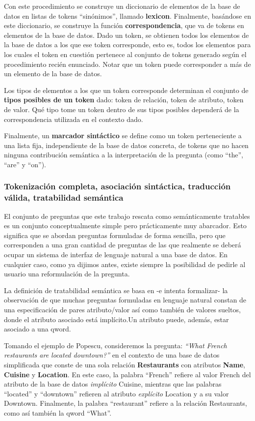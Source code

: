 Con este procedimiento se construye un diccionario de elementos de la base de datos en listas de tokens ``sinónimos'', llamado \textbf{lexicon}. Finalmente, basándose en este diccionario, se construye la función \textbf{correspondencia}, que va de tokens en elementos de la base de datos.
Dado un token, se obtienen todos los elementos de la base de datos a los que ese token corresponde, esto es, todos los elementos para los cuales el token en cuestión pertenece al conjunto de tokens generado según el procedimiento recién enunciado. Notar que un token puede corresponder a más de un elemento de la base de datos.

Los tipos de elementos a los que un token corresponde determinan el conjunto de \textbf{tipos posibles de un token} dado: token de relación, token de atributo, token de valor. Qué tipo tome un token dentro de sus tipos posibles dependerá de la correspondencia utilizada en el contexto dado.

Finalmente, un \textbf{marcador sintáctico} se define como un token perteneciente a una lista fija, independiente de la base de datos concreta, de tokens que no hacen ninguna contribución semántica a la interpretación de la pregunta (como ``the'', ``are'' y ``on'').

\subsubsection*{Tokenización completa, asociación sintáctica, traducción válida, tratabilidad semántica}

El conjunto de preguntas que este trabajo rescata como semánticamente tratables es un conjunto conceptualmente simple pero prácticamente muy abarcador. Esto significa que se abordan preguntas formuladas de forma sencilla, pero que corresponden a una gran cantidad de preguntas de las que realmente se deberá ocupar un sistema de interfaz de lenguaje natural a una base de datos. En cualquier caso, como ya dijimos antes, existe siempre la posibilidad de pedirle al usuario una reformulación de la pregunta.


La definición de tratabilidad semántica se basa en -e intenta formalizar- la observación de que muchas preguntas formuladas en lenguaje natural constan de una especificación de pares atributo/valor así como también de valores sueltos, donde el atributo asociado está implícito.Un atributo puede, además, estar asociado a una qword.

\medskip

Tomando el ejemplo de Popescu, consideremos la pregunta: \textit{“What French restaurants are located downtown?”} en el contexto de una base de datos simplificada que conste de una sola relación \textbf{Restaurants} con atributos \textbf{Name}, \textbf{Cuisine} y \textbf{Location}. En este caso, la palabra “French” refiere al valor French del atributo de la base de datos \textit{implícito} Cuisine, mientras que las palabras  “located”  y “downtown” refieren al atributo \textit{explícito} Location y a su valor Downtown. Finalmente, la palabra “restaurant” refiere a la relación Restaurants, como así también la qword “What”.

